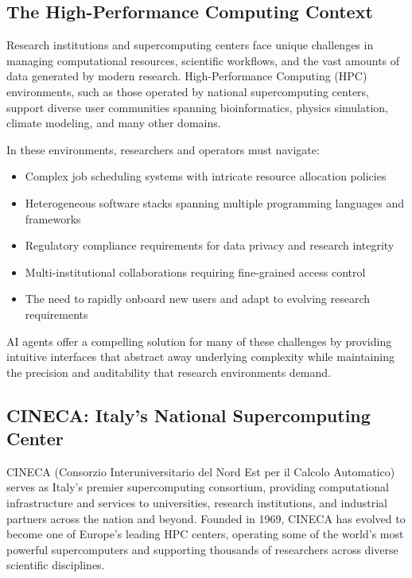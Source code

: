\subsection{The High-Performance Computing Context}

Research institutions and supercomputing centers face unique challenges in managing computational resources, scientific workflows, and the vast amounts of data generated by modern research. High-Performance Computing (HPC) environments, such as those operated by national supercomputing centers, support diverse user communities spanning bioinformatics, physics simulation, climate modeling, and many other domains.

In these environments, researchers and operators must navigate:

\begin{itemize}
    \item Complex job scheduling systems with intricate resource allocation policies
    \item Heterogeneous software stacks spanning multiple programming languages and frameworks
    \item Regulatory compliance requirements for data privacy and research integrity
    \item Multi-institutional collaborations requiring fine-grained access control
    \item The need to rapidly onboard new users and adapt to evolving research requirements
\end{itemize}

AI agents offer a compelling solution for many of these challenges by providing intuitive interfaces that abstract away underlying complexity while maintaining the precision and auditability that research environments demand.

\subsection{CINECA: Italy's National Supercomputing Center}

CINECA (Consorzio Interuniversitario del Nord Est per il Calcolo Automatico)~\cite{cineca2023} serves as Italy's premier supercomputing consortium, providing computational infrastructure and services to universities, research institutions, and industrial partners across the nation and beyond. Founded in 1969, CINECA has evolved to become one of Europe's leading HPC centers, operating some of the world's most powerful supercomputers and supporting thousands of researchers across diverse scientific disciplines.

